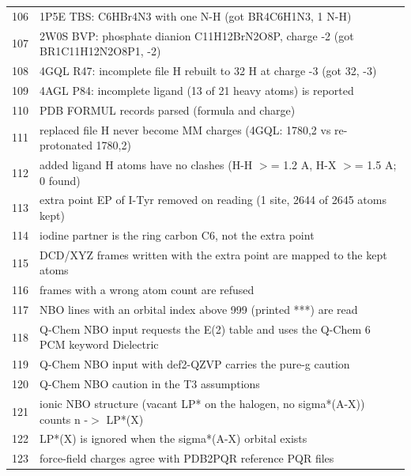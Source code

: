 {\begin{longtable}{rp{14.5cm}}
106 & 1P5E TBS: C6HBr4N3 with one N-H (got BR4C6H1N3, 1 N-H)\\
107 & 2W0S BVP: phosphate dianion C11H12BrN2O8P, charge -2 (got BR1C11H12N2O8P1, -2)\\
108 & 4GQL R47: incomplete file H rebuilt to 32 H at charge -3 (got 32, -3)\\
109 & 4AGL P84: incomplete ligand (13 of 21 heavy atoms) is reported\\
110 & PDB FORMUL records parsed (formula and charge)\\
111 & replaced file H never become MM charges (4GQL: 1780,2 vs re-protonated 1780,2)\\
112 & added ligand H atoms have no clashes (H-H $>$= 1.2 A, H-X $>$= 1.5 A; 0 found)\\
113 & extra point EP of I-Tyr removed on reading (1 site, 2644 of 2645 atoms kept)\\
114 & iodine partner is the ring carbon C6, not the extra point\\
115 & DCD/XYZ frames written with the extra point are mapped to the kept atoms\\
116 & frames with a wrong atom count are refused\\
117 & NBO lines with an orbital index above 999 (printed ***) are read\\
118 & Q-Chem NBO input requests the E(2) table and uses the Q-Chem 6 PCM keyword Dielectric\\
119 & Q-Chem NBO input with def2-QZVP carries the pure-g caution\\
120 & Q-Chem NBO caution in the T3 assumptions\\
121 & ionic NBO structure (vacant LP* on the halogen, no sigma*(A-X)) counts n -$>$ LP*(X)\\
122 & LP*(X) is ignored when the sigma*(A-X) orbital exists\\
123 & force-field charges agree with PDB2PQR reference PQR files\\
\end{longtable}}
